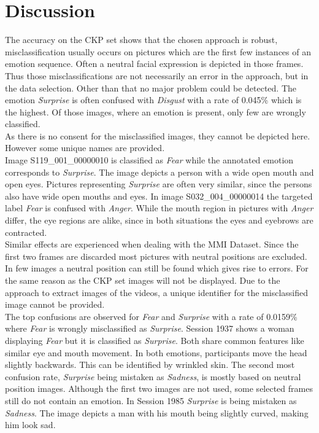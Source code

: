 \documentclass[10pt,journal,compsoc, hidelinks]{IEEEtran}
\begin{document}
 \section{Discussion}
\label{sec:discussion}

The accuracy on the CKP set shows that the chosen approach is robust, misclassification usually occurs on pictures which are the first few instances of an emotion sequence. Often a neutral facial expression is depicted in those frames. Thus those misclassifications are not necessarily an error in the approach, but in the data selection. Other than that no major problem could be detected. The emotion \textit{Surprise} is often confused with \textit{Disgust} with a rate of 0.045\% which is the highest. Of those images, where an emotion is present, only few are wrongly classified.\\ 


As there is no consent for the misclassified images, they cannot be depicted here. However some unique names are provided. \\
Image S119\_001\_00000010 is classified as \textit{Fear} while the annotated emotion corresponds to \textit{Surprise}. The image depicts a person with a wide open mouth and open eyes. Pictures representing \textit{Surprise} are often very similar, since the persons also have wide open mouths and eyes. In image S032\_004\_00000014 the targeted label \textit{Fear} is confused with \textit{Anger}. While the mouth region in pictures with \textit{Anger} differ, the eye regions are alike, since in both situations the eyes and eyebrows are contracted.\\
Similar effects are experienced when dealing with the MMI Dataset. Since the first two frames are discarded most pictures with neutral positions are excluded. In few images a neutral position can still be found which gives rise to errors. For the same reason as the CKP set images will not be displayed. Due to the approach to extract images of the videos, a unique identifier for the misclassified image cannot be provided.\\
The top confusions are observed for \textit{Fear} and \textit{Surprise} with a rate of 0.0159\% where \textit{Fear} is wrongly misclassified as \textit{Surprise}. Session 1937 shows a woman displaying \textit{Fear} but it is classified as \textit{Surprise}. Both share common features like similar eye and mouth movement. In both emotions, participants move the head slightly backwards. This can be identified by wrinkled skin. The second most confusion rate, \textit{Surprise} being mistaken as \textit{Sadness}, is mostly based on neutral position images. Although the first two images are not used, some selected frames still do not contain an emotion. In Session 1985 \textit{Surprise} is being mistaken as \textit{Sadness}. The image depicts a man with his mouth being slightly curved, making him look sad.\\
\end{document}
